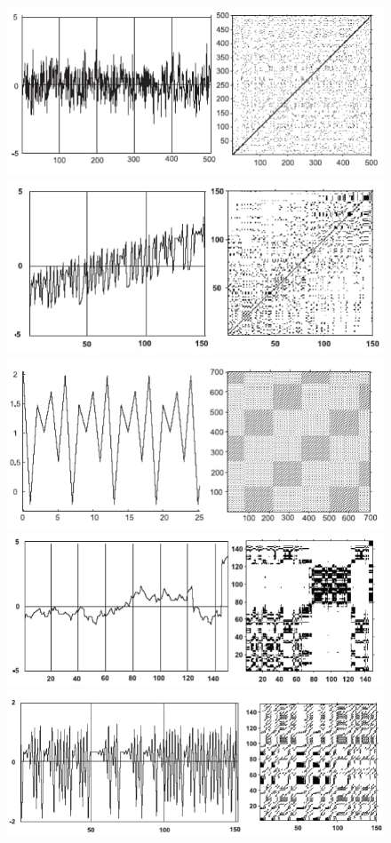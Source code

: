 \documentclass[
  letterpaper,
]{report}
\begin{document}
\begin{figure}

{\centering 

\includegraphics{Images/lab_2/2_3.jpg}
\includegraphics{Images/lab_2/2_4.jpg}
\includegraphics{Images/lab_2/2_5.jpg}
\includegraphics{Images/lab_2/2_6.jpg}
\includegraphics{Images/lab_2/2_7.jpg}

}
\end{figure}
\end{document}

